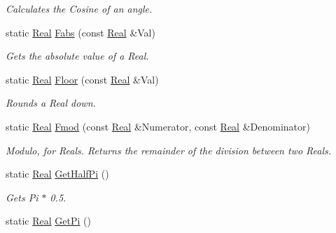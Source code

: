\begin{DoxyCompactItemize}
\begin{DoxyCompactList}\small\item\em Calculates the Cosine of an angle. \item\end{DoxyCompactList}\item 
static \hyperlink{namespaceMezzanine_a726731b1a7df72bf3583e4a97282c6f6}{Real} \hyperlink{classMezzanine_1_1MathTool_a96b1935e6ed6d9d2ffa03fd2e7698c3e}{Fabs} (const \hyperlink{namespaceMezzanine_a726731b1a7df72bf3583e4a97282c6f6}{Real} \&Val)
\begin{DoxyCompactList}\small\item\em Gets the absolute value of a Real. \item\end{DoxyCompactList}\item 
static \hyperlink{namespaceMezzanine_a726731b1a7df72bf3583e4a97282c6f6}{Real} \hyperlink{classMezzanine_1_1MathTool_a51eae53cadb52839ae6edb279627fabd}{Floor} (const \hyperlink{namespaceMezzanine_a726731b1a7df72bf3583e4a97282c6f6}{Real} \&Val)
\begin{DoxyCompactList}\small\item\em Rounds a Real down. \item\end{DoxyCompactList}\item 
static \hyperlink{namespaceMezzanine_a726731b1a7df72bf3583e4a97282c6f6}{Real} \hyperlink{classMezzanine_1_1MathTool_a4e4171768a241441a1ed0b33c68bdc9c}{Fmod} (const \hyperlink{namespaceMezzanine_a726731b1a7df72bf3583e4a97282c6f6}{Real} \&Numerator, const \hyperlink{namespaceMezzanine_a726731b1a7df72bf3583e4a97282c6f6}{Real} \&Denominator)
\begin{DoxyCompactList}\small\item\em Modulo, for Reals. Returns the remainder of the division between two Reals. \item\end{DoxyCompactList}\item 
static \hyperlink{namespaceMezzanine_a726731b1a7df72bf3583e4a97282c6f6}{Real} \hyperlink{classMezzanine_1_1MathTool_afeaaaf9f445283c16310b4f15c44d03e}{GetHalfPi} ()
\begin{DoxyCompactList}\small\item\em Gets Pi $\ast$ 0.5. \item\end{DoxyCompactList}\item 
static \hyperlink{namespaceMezzanine_a726731b1a7df72bf3583e4a97282c6f6}{Real} \hyperlink{classMezzanine_1_1MathTool_a041b328e51d402deda1660b6d30508f5}{GetPi} ()

\end{DoxyCompactItemize}
